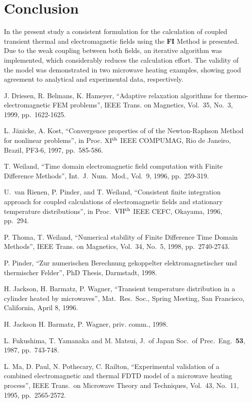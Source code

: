 \documentclass[twocolumn]{IEEEtran}
\begin{document}
\section{Conclusion}
In the present study a consistent formulation for the calculation
of coupled transient thermal and electromagnetic fields using the
{\bf FI} Method is presented. Due to the weak coupling between both
fields, an iterative algorithm was implemented, which considerably
reduces the calculation effort. The validity of the model was demonstrated
in two microwave heating examples, showing good agreement to analytical
and experimental data, respectively.



\begin{thebibliography}{9}

J. Driesen, R. Belmans, K. Hameyer, ``Adaptive relaxation algorithms
for thermo-electromagnetic FEM problems'', IEEE Trans. on Magnetics,
Vol.\ 35, No.\ 3, 1999, pp.~1622-1625.

L. J\"anicke, A. Kost, ``Convergence properties of of the Newton-Raphson
Method for nonlinear problems'', in Proc.  $\rm XI^{th}$ IEEE COMPUMAG,
Rio de Janeiro, Brazil, PF3-6, 1997, pp.~585-586.

T. Weiland, ``Time domain electromagnetic field computation with Finite
Difference Methods'', Int.\ J.\ Num.\ Mod., Vol.~9, 1996, pp.~259-319.

U.~van Rienen, P. Pinder, and T. Weiland, ``Consistent finite integration
approach for coupled calculations of electromagnetic fields and stationary
temperature distributions'', in  Proc.\ $\rm VII^{th}$ IEEE CEFC, Okayama,
1996, pp.~294.

P. Thoma, T. Weiland, ``Numerical stability of Finite Difference Time Domain
Methods'', IEEE Trans. on Magnetics, Vol.\ 34, No.\ 5, 1998, pp.~2740-2743.

P. Pinder, ``Zur numerischen Berechnung gekoppelter elektromagnetischer
und thermischer Felder'', PhD Thesis, Darmstadt, 1998.

H. Jackson, H. Barmatz, P. Wagner, ``Transient temperature distribution
in a cylinder heated by microwaves'', Mat.\ Res.\ Soc., Spring Meeting,
San Francisco, California, April 8, 1996.

H. Jackson H. Barmatz, P. Wagner, priv. comm., 1998.

L. Fukushima, T. Yamanaka and M. Matsui, J.\ of Japan Soc.\ of Prec.\
Eng.\ {\bf 53}, 1987, pp.~743-748.

 L. Ma, D. Paul, N. Pothecary, C. Railton, ``Experimental
validation of a combined electromagnetic and thermal FDTD model of a
microwave heating process'', IEEE Trans.\ on Microwave Theory and
Techniques, Vol.\ 43, No.\ 11, 1995, pp.~2565-2572.

\end{thebibliography}
\end{document}

